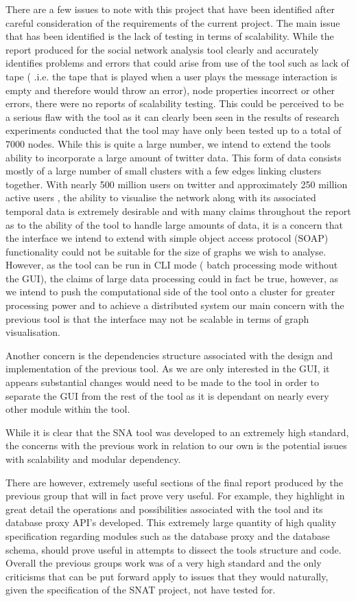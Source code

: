 There are a few issues to note with this project that have been identified after careful consideration of the requirements of the current project. The main issue that has been identified is the lack of testing in terms of scalability. While the report produced for the social network analysis tool clearly and accurately identifies problems and errors that could arise from use of the tool such as lack of tape ( .i.e. the tape that is played when a user plays the message interaction is empty and therefore would throw an error), node properties incorrect or other errors, there were no reports of scalability testing. This could be perceived to be a serious flaw with the tool as it can clearly been seen in the results of research experiments conducted that the tool may have only been tested up to a total of 7000 nodes. While this is quite a large number, we intend to extend the tools ability to incorporate a large amount of twitter data. This form of data consists mostly of a large number of small clusters with a few edges linking clusters together. With nearly 500 million users on twitter and approximately 250 million active users \cite{alltwitter}, the ability to visualise the network along with its associated temporal data is extremely desirable and with many claims throughout the report as to the ability of the tool to handle large amounts of data, it is a concern that the interface we intend to extend with simple object access protocol (SOAP) functionality could not be suitable for the size of graphs we wish to analyse. However, as the tool can be run in CLI mode ( batch processing mode without the GUI), the claims of large data processing could in fact be true, however, as we intend to push the computational side of the tool onto a cluster for greater processing power and to achieve a distributed system our main concern with the previous tool is that the interface may not be scalable in terms of graph visualisation.

Another concern is the dependencies structure associated with the design and implementation of the previous tool. As we are only interested in the GUI, it appears substantial changes would need to be made to the tool in order to separate the GUI from the rest of the tool as it is dependant on nearly every other module within the tool. 

While it is clear that the SNA tool was developed to an extremely high standard, the concerns with the previous work in relation to our own is the potential issues with scalability and modular dependency.

There are however, extremely useful sections of the final report produced by the previous group that will in fact prove very useful. For example, they highlight in great detail the operations and possibilities associated with the tool and its database proxy API's developed. This extremely large quantity of high quality specification regarding modules such as the database proxy and the database schema, should prove useful in attempts to dissect the tools structure and code. 
Overall the previous groups work was of a very high standard and the only criticisms that can be put forward apply to issues that they would naturally, given the specification of the SNAT project, not have tested for.
